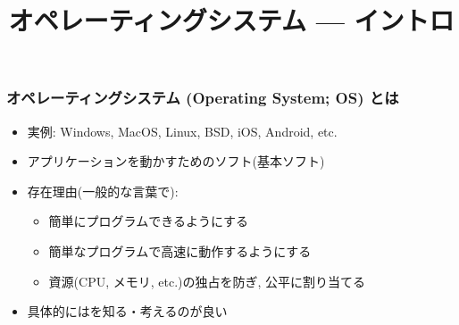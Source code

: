 \documentclass[12pt,dvipdfmx]{beamer}
\title{オペレーティングシステム --- イントロ}
\begin{document}
\maketitle


\section{}

\begin{frame}
\frametitle{オペレーティングシステム (Operating System; OS) とは}
\begin{itemize}
\item 実例: Windows, MacOS, Linux, BSD, iOS, Android, etc.
\item アプリケーションを動かすためのソフト(基本ソフト)
\item 存在理由(一般的な言葉で):
  \begin{itemize}
  \item {} 簡単にプログラムできるようにする
  \item {} 簡単なプログラムで高速に動作するようにする
  \item {} 資源(CPU, メモリ, etc.)の独占を防ぎ,
    公平に割り当てる
  \end{itemize}
\item 具体的にはを知る・考えるのが良い
\end{itemize}
\end{frame}
\end{document}
